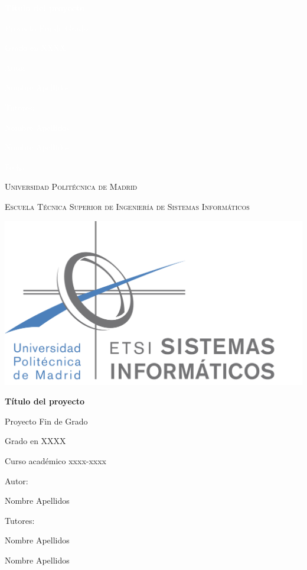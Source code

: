 \documentclass[a4paper]{report}
\begin{document}
\begin{titlepage}
{\bfseries\Huge \textcolor{white}{Título del proyecto} \par}
\vfill
{\Large \textcolor{white}{Proyecto Fin de Grado} \par}
\vfill
{\Large \textcolor{white}{Grado en XXXX} \par}
\vfill
{\Large \textcolor{white}{Autor:} \par}
{\Large \textcolor{white}{Nombre Apellidos} \par}
\vfill
{\Large \textcolor{white}{Tutores:} \par}
{\Large \textcolor{white}{Nombre Apellidos} \par}
{\Large \textcolor{white}{Nombre Apellidos} \par}
\vfill
{\Large \textcolor{white}{Fecha} \par}
\newpage

\thispagestyle{empty}
\centering %
{\scshape\Large  Universidad Politécnica de Madrid \par}
{\scshape\Large Escuela Técnica Superior de Ingeniería de Sistemas Informáticos \par}
\vfill
{\includegraphics[width=1\textwidth]{logo_etsisi.png}\par}
\vfill
{\bfseries\LARGE Título del proyecto \par}
\vfill
{\Large Proyecto Fin de Grado \par}
\vfill
{\Large Grado en XXXX \par}
\vfill
{\Large Curso académico xxxx-xxxx \par}
\vfill
{\Large Autor: \par}
{\Large Nombre Apellidos \par}
\vfill
{\Large Tutores: \par}
{\Large Nombre Apellidos \par}
{\Large Nombre Apellidos \par}

\end{titlepage}
\end{document}
